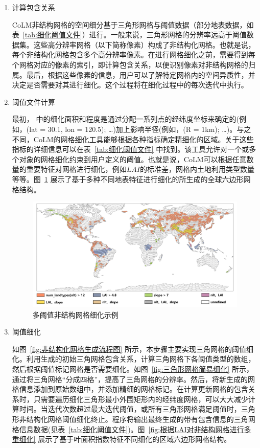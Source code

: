 \begin{enumerate}
\item 计算包含关系

CoLM非结构网格的空间细分基于三角形网格与阈值数据（部分地表数据，如表~\ref{tab:细化阈值文件}）进行。一般来说，三角形网格的分辨率远高于阈值数据集。这些高分辨率网格（以下简称像素）构成了非结构化网格。也就是说，每个非结构化网格包含多个高分辨率像素。在进行网格细化之前，需要得到每个网格对应的像素的索引，即计算包含关系，以便识别像素对非结构网格的归属。最后，根据这些像素的信息，用户可以了解特定网格内的空间异质性，并决定是否需要对其进行细化。这个过程将在细化过程中的每次迭代中执行。

\item 阈值文件计算


最初，\citet{walko_direct_2011} 中的细化面积和程度是通过分配一系列点的经纬度坐标来确定的(例如，(lat = 30.1, lon = 120.5); \dots)加上影响半径(例如，(R = 1km); \dots)。与之不同，CoLM的网格细化工具能够根据各种指标确定精细化的区域。关于这些指标的详细信息可以在表~\ref{tab:细化阈值文件} 中找到。该工具允许对一个或多个对象的网格细化约束到用户定义的阈值。也就是说，CoLM可以根据任意数量的重要特征对网格进行细化，例如$LAI$的标准差，网格内土地利用类型数量等等。图~\ref{fig:多阈值非结构网格细化} 展示了基于多种不同地表特征进行细化的所生成的全球六边形网格结构。

{
\begin{figure}[htbp]
\centering
\includegraphics[width=\textwidth]{Figures/模式构架/多阈值非结构网格细化.png}
\caption{多阈值非结构网格细化示例}
\label{fig:多阈值非结构网格细化}
\end{figure}
}

\item 阈值细化

如图~\ref{fig:非结构化网格生成流程图} 所示，本步骤主要实现三角网格的阈值细化。利用生成的初始三角网格包含关系，计算三角网格下各阈值类型的数组，然后根据阈值标记网格是否需要细化。如图~\ref{fig:三角形网格简易细化} 所示，通过将三角网格“分成四格”，提高了三角网格的分辨率。然后，将新生成的网格信息添加到原始数组中，并添加精细的网格标记。在计算更新网格的包含关系时，只需要遍历细化三角形最小外围矩形内的经纬度网格，可以大大减少计算时间。当迭代次数超过最大迭代阈值，或所有三角形网格满足阈值时，三角形非结构化网格阈值细化终止。程序将输出最终生成的带有包含信息的三角网格信息数据(见表~\ref{tab:细化阈值文件})。图~\ref{fig:根据LAI对非结构网格进行多重细化} 展示了基于叶面积指数特征不同细化的区域六边形网格结构。


\end{enumerate}
